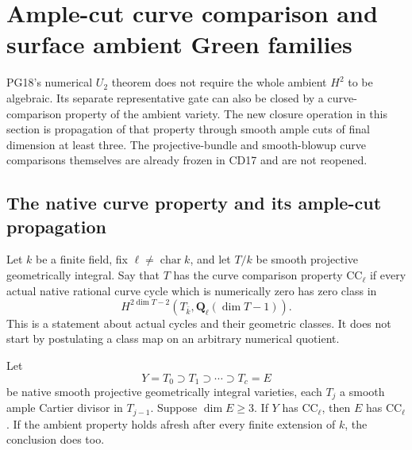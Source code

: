 \section{Ample-cut curve comparison and surface ambient Green families}
\label{r18sc:section}

PG18's numerical $U_2$ theorem does not require the whole ambient
$H^2$ to be algebraic.  Its separate representative gate can also
be closed by a curve-comparison property of the ambient variety.
The new closure operation in this section is propagation of that
property through smooth ample cuts of final dimension at least
three.  The projective-bundle and smooth-blowup curve comparisons
themselves are already frozen in CD17 and are not reopened.

\subsection{The native curve property and its ample-cut propagation}

Let $k$ be a finite field, fix $\ell\ne\operatorname{char}k$,
and let $T/k$ be smooth projective geometrically integral.
Say that $T$ has the curve comparison property $\mathrm{CC}_\ell$
if every actual native rational curve cycle which is numerically
zero has zero class in
\[
 H^{2\dim T-2}(T_{\bar k},\mathbf Q_\ell(\dim T-1)).
 \tag{SC18.1}\label{r18sc:CC}
\]
This is a statement about actual cycles and their geometric
classes.  It does not start by postulating a class map on
an arbitrary numerical quotient.

\begin{lemma}
\label{r18sc:ample-cuts}
Let
\[
 Y=T_0\supset T_1\supset\cdots\supset T_c=E
 \tag{SC18.2}\label{r18sc:cuts}
\]
be native smooth projective geometrically integral varieties,
each $T_j$ a smooth ample Cartier divisor in $T_{j-1}$.
Suppose $\dim E\ge3$.  If $Y$ has $\mathrm{CC}_\ell$,
then $E$ has $\mathrm{CC}_\ell$.
If the ambient property holds afresh after every finite
extension of $k$, the conclusion does too.
\end{lemma}

